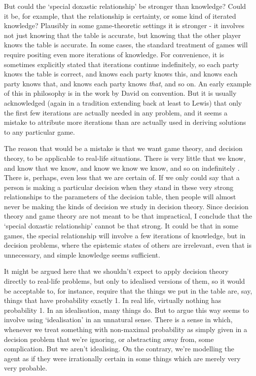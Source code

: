 \documentclass[11pt,]{book}
\begin{document}
But could the `special doxastic relationship' be stronger than knowledge? Could it be, for example, that the relationship is certainty, or some kind of iterated knowledge? Plausibly in some game-theoretic settings it is stronger - it involves not just knowing that the table is accurate, but knowing that the other player knows the table is accurate. In some cases, the standard treatment of games will require positing even more iterations of knowledge. For convenience, it is sometimes explicitly stated that iterations continue indefinitely, so each party knows the table is correct, and knows each party knows this, and knows each party knows that, and knows each party knows \emph{that}, and so on. An early example of this in philosophy is in the work by David \citet{Lewis1969a} on convention. But it is usually acknowledged (again in a tradition extending back at least to Lewis) that only the first few iterations are actually needed in any problem, and it seems a mistake to attribute more iterations than are actually used in deriving solutions to any particular game.

The reason that would be a mistake is that we want game theory, and decision theory, to be applicable to real-life situations. There is very little that we know, and know that we know, and know we know we know, and so on indefinitely \citep[Ch. 4]{Williamson2000}. There is, perhaps, even less that we are certain of. If we only could say that a person is making a particular decision when they stand in these very strong relationships to the parameters of the decision table, then people will almost never be making the kinds of decision we study in decision theory. Since decision theory and game theory are not meant to be that impractical, I conclude that the `special doxastic relationship' cannot be that strong. It could be that in some games, the special relationship will involve a few iterations of knowledge, but in decision problems, where the epistemic states of others are irrelevant, even that is unnecessary, and simple knowledge seems sufficient.

It might be argued here that we shouldn't expect to apply decision theory directly to real-life problems, but only to idealised versions of them, so it would be acceptable to, for instance, require that the things we put in the table are, say, things that have probability exactly 1. In real life, virtually nothing has probability 1. In an idealisation, many things do. But to argue this way seems to involve using `idealisation' in an unnatural sense. There is a sense in which, whenever we treat something with non-maximal probability as simply given in a decision problem that we're ignoring, or abstracting away from, some complication. But we aren't idealising. On the contrary, we're modelling the agent as if they were irrationally certain in some things which are merely very very probable.
\end{document}
